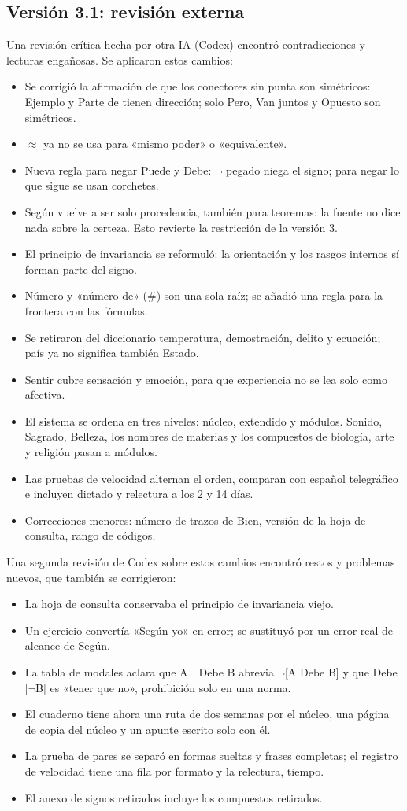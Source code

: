 \subsection{Versión 3.1: revisión externa}
Una revisión crítica hecha por otra IA (Codex) encontró contradicciones y
lecturas engañosas. Se aplicaron estos cambios:
\begin{itemize}
\item Se corrigió la afirmación de que los conectores sin punta son simétricos:
 Ejemplo y Parte de tienen dirección; solo Pero, Van juntos y Opuesto son simétricos.
\item \(\approx\) ya no se usa para «mismo poder» o «equivalente».
\item Nueva regla para negar Puede y Debe: \(\neg\) pegado niega el signo; para
 negar lo que sigue se usan corchetes.
\item Según vuelve a ser solo procedencia, también para teoremas: la fuente no
 dice nada sobre la certeza. Esto revierte la restricción de la versión 3.
\item El principio de invariancia se reformuló: la orientación y los rasgos
 internos sí forman parte del signo.
\item Número y «número de» (\#) son una sola raíz; se añadió una regla para la
 frontera con las fórmulas.
\item Se retiraron del diccionario temperatura, demostración, delito y ecuación;
 país ya no significa también Estado.
\item Sentir cubre sensación y emoción, para que experiencia no se lea solo
 como afectiva.
\item El sistema se ordena en tres niveles: núcleo, extendido y módulos.
 Sonido, Sagrado, Belleza, los nombres de materias y los compuestos de
 biología, arte y religión pasan a módulos.
\item Las pruebas de velocidad alternan el orden, comparan con español
 telegráfico e incluyen dictado y relectura a los 2 y 14 días.
\item Correcciones menores: número de trazos de Bien, versión de la hoja de
 consulta, rango de códigos.
\end{itemize}
Una segunda revisión de Codex sobre estos cambios encontró restos y problemas
nuevos, que también se corrigieron:
\begin{itemize}
\item La hoja de consulta conservaba el principio de invariancia viejo.
\item Un ejercicio convertía «Según yo» en error; se sustituyó por un error
 real de alcance de Según.
\item La tabla de modales aclara que A \(\neg\)Debe B abrevia \(\neg\)[A Debe B]
 y que Debe [\(\neg\)B] es «tener que no», prohibición solo en una norma.
\item El cuaderno tiene ahora una ruta de dos semanas por el núcleo, una página
 de copia del núcleo y un apunte escrito solo con él.
\item La prueba de pares se separó en formas sueltas y frases completas; el
 registro de velocidad tiene una fila por formato y la relectura, tiempo.
\item El anexo de signos retirados incluye los compuestos retirados.
\end{itemize}
